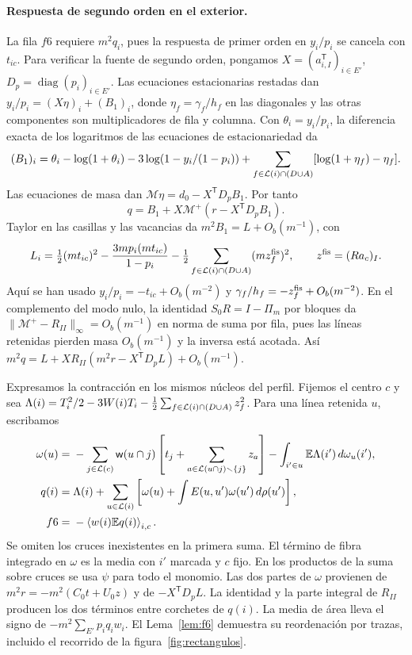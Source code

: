 \paragraph{Respuesta de segundo orden en el exterior.}
La fila \(f6\) requiere \(m^2q_i\), pues la respuesta de primer orden en \(y_i/p_i\)
se cancela con \(t_{ic}\). Para verificar la fuente de segundo orden, pongamos
\(X=(a_{i,I}^{\mathsf T})_{i\in E'}\), \(D_p=\operatorname{diag}(p_i)_{i\in E'}\).
Las ecuaciones estacionarias restadas dan \(y_i/p_i=(X\eta)_i+(B_1)_i\), donde
\(\eta_f=\gamma_f/h_f\) en las diagonales y las otras componentes son multiplicadores
de fila y columna. Con \(\theta_i=y_i/p_i\), la diferencia exacta de los logaritmos
de las ecuaciones de estacionariedad da
\[
 (B_1)_i=\theta_i-\log(1+\theta_i)-3\log(1-y_i/(1-p_i))
 +\sum_{f\in \mathcal L(i)\cap(D\cup A)}[\log(1+\eta_f)-\eta_f].
\]
Las ecuaciones de masa dan
\(\mathcal M\eta=d_0-X^{\mathsf T}D_pB_1\). Por tanto
\[
 q=B_1+X\mathcal M^+(r-X^{\mathsf T}D_p B_1).
\]
Taylor en las casillas y las vacancias da \(m^2B_1=L+O_b(m^{-1})\), con
\[
 L_i=\tfrac12(mt_{ic})^2-\frac{3mp_i(mt_{ic})}{1-p_i}
       -\tfrac12\sum_{f\in \mathcal L(i)\cap(D\cup A)}(mz_f^{\rm fis})^2,\qquad
 z^{\rm fis}=(Ra_c)_I .
\]
Aquí se han usado \(y_i/p_i=-t_{ic}+O_b(m^{-2})\) y
\(\gamma_f/h_f=-z_f^{\rm fis}+O_b(m^{-2})\).
En el complemento del modo nulo, la identidad \(S_0R=I-\Pi_m\) por bloques da
\(\|\mathcal M^+-R_{II}\|_\infty=O_b(m^{-1})\) en norma de suma por fila,
pues las líneas retenidas pierden masa \(O_b(m^{-1})\) y la inversa está acotada.
Así \(m^2q=L+XR_{II}(m^2r-X^{\mathsf T}D_pL)+O_b(m^{-1})\).

Expresamos la contracción en los mismos núcleos del perfil. Fijemos el centro \(c\) y sea
\(\Lambda(i)=T_i^2/2-3W(i)T_i-\tfrac12\sum_{f\in \mathcal L(i)\cap(D\cup A)}z_f^2\).
Para una línea retenida \(u\), escribamos
\begin{align*}
 \omega(u)={}&-\sum_{j\in \mathcal L(c)} \mathsf w(u\cap j)
     \left[t_j+\sum_{a\in \mathcal L(u\cap j)\smallsetminus\{j\}}z_a\right]
      -\int_{i'\in u}\mathbb E\Lambda(i')\,d\omega_u(i'),\\
 q(i)={}&\Lambda(i)+\sum_{u\in \mathcal L(i)}
 \left[\omega(u)+\int E(u,u')\omega(u')\,d\rho(u')\right],\\
 f6={}&-\left\langle w(i)\mathbb E q(i)\right\rangle_{i,c}.
\end{align*}
Se omiten los cruces inexistentes en la primera suma. El término de fibra integrado en
\(\omega\) es la media con \(i'\) marcada y \(c\) fijo. En los productos de la suma sobre
cruces se usa \(\psi\) para todo el monomio. Las dos partes de \(\omega\) provienen de
\(m^2r=-m^2(C_0t+U_0z)\) y de \(-X^{\mathsf T}D_pL\). La identidad y la parte integral
de \(R_{II}\) producen los dos términos entre corchetes de \(q(i)\). La media de área
lleva el signo de \(-m^2\sum_{E'}p_iq_iw_i\). El Lema~\ref{lem:f6} demuestra su
reordenación por trazas, incluido el recorrido de la figura~\ref{fig:rectangulos}.

